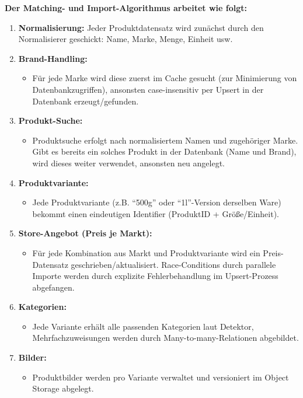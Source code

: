 \textbf{Der Matching- und Import-Algorithmus arbeitet wie folgt:}
\begin{enumerate}
    \item \textbf{Normalisierung:} Jeder Produktdatensatz wird zunächst durch den Normalisierer geschickt: Name, Marke, Menge, Einheit usw.
    \item \textbf{Brand-Handling:}
        \begin{itemize}
            \item Für jede Marke wird diese zuerst im Cache gesucht (zur Minimierung von Datenbankzugriffen), ansonsten case-insensitiv per Upsert in der Datenbank erzeugt/gefunden.
        \end{itemize}
    \item \textbf{Produkt-Suche:}
        \begin{itemize}
            \item Produktsuche erfolgt nach normalisiertem Namen und zugehöriger Marke. Gibt es bereits ein solches Produkt in der Datenbank (Name und Brand), wird dieses weiter verwendet, ansonsten neu angelegt.
        \end{itemize}
    \item \textbf{Produktvariante:}
        \begin{itemize}
            \item Jede Produktvariante (z.B. "`500g"' oder "`1l"'-Version derselben Ware) bekommt einen eindeutigen Identifier (ProduktID + Größe/Einheit).
        \end{itemize}
    \item \textbf{Store-Angebot (Preis je Markt):}
        \begin{itemize}
            \item Für jede Kombination aus Markt und Produktvariante wird ein Preis-Datensatz geschrieben/aktualisiert. Race-Conditions durch parallele Importe werden durch explizite Fehlerbehandlung im Upsert-Prozess abgefangen.
        \end{itemize}
    \item \textbf{Kategorien:}
        \begin{itemize}
            \item Jede Variante erhält alle passenden Kategorien laut Detektor, Mehrfachzuweisungen werden durch Many-to-many-Relationen abgebildet.
        \end{itemize}
    \item \textbf{Bilder:}
        \begin{itemize}
            \item Produktbilder werden pro Variante verwaltet und versioniert im Object Storage abgelegt.
        \end{itemize}
\end{enumerate}

